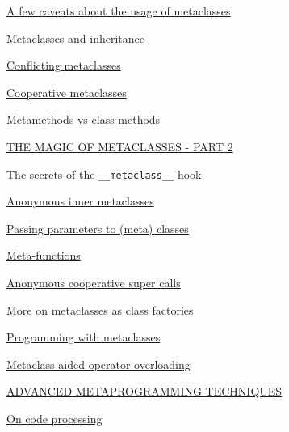 \documentclass[10pt,english]{article}
\begin{document}
\begin{list}{}{}
\begin{list}{}{}
\item {} \href{\#a-few-caveats-about-the-usage-of-metaclasses}{A few caveats about the usage of metaclasses}

\item {} \href{\#metaclasses-and-inheritance}{Metaclasses and inheritance}

\item {} \href{\#conflicting-metaclasses}{Conflicting metaclasses}

\item {} \href{\#cooperative-metaclasses}{Cooperative metaclasses}

\item {} \href{\#metamethods-vs-class-methods}{Metamethods vs class methods}

\end{list}

\item {} \href{\#the-magic-of-metaclasses-part-2}{THE MAGIC OF METACLASSES - PART 2}
\begin{list}{}{}
\item {} \href{\#the-secrets-of-the-metaclass-hook}{The secrets of the \texttt{{\_}{\_}metaclass{\_}{\_}} hook}

\item {} \href{\#anonymous-inner-metaclasses}{Anonymous inner metaclasses}

\item {} \href{\#passing-parameters-to-meta-classes}{Passing parameters to (meta) classes}

\item {} \href{\#meta-functions}{Meta-functions}

\item {} \href{\#anonymous-cooperative-super-calls}{Anonymous cooperative super calls}

\item {} \href{\#more-on-metaclasses-as-class-factories}{More on metaclasses as class factories}

\item {} \href{\#programming-with-metaclasses}{Programming with metaclasses}

\item {} \href{\#metaclass-aided-operator-overloading}{Metaclass-aided operator overloading}

\end{list}

\item {} \href{\#advanced-metaprogramming-techniques}{ADVANCED METAPROGRAMMING TECHNIQUES}
\begin{list}{}{}
\item {} \href{\#on-code-processing}{On code processing}


\end{list}
\end{list}
\end{document}
